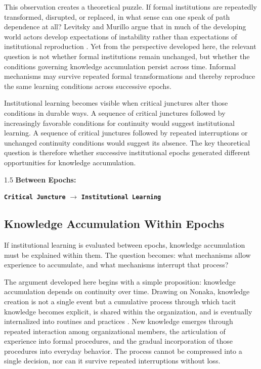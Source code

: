 \documentclass[doc, 12pt, a4paper,floatsintext]{apa7}
\begin{document}
This observation creates a theoretical puzzle. If formal institutions are repeatedly transformed, disrupted, or replaced, in what sense can one speak of path dependence at all? Levitsky and Murillo argue that in much of the developing world actors develop expectations of instability rather than expectations of institutional reproduction \parencite[123]{levitsky_variation_2009}. Yet from the perspective developed here, the relevant question is not whether formal institutions remain unchanged, but whether the conditions governing knowledge accumulation persist across time. Informal mechanisms may survive repeated formal transformations and thereby reproduce the same learning conditions across successive epochs.

Institutional learning becomes visible when critical junctures alter those conditions in durable ways. A sequence of critical junctures followed by increasingly favorable conditions for continuity would suggest institutional learning. A sequence of critical junctures followed by repeated interruptions or unchanged continuity conditions would suggest its absence. The key theoretical question is therefore whether successive institutional epochs generated different opportunities for knowledge accumulation.

\begin{spacing}{1.5}
\noindent
\textbf{Between Epochs:}

\texttt{\bf Critical Juncture}
$\rightarrow$
\texttt{\bf Institutional Learning}
\end{spacing}

\subsection{Knowledge Accumulation Within Epochs}

If institutional learning is evaluated between epochs, knowledge accumulation must be explained within them. The question becomes: what mechanisms allow experience to accumulate, and what mechanisms interrupt that process?

The argument developed here begins with a simple proposition: knowledge accumulation depends on continuity over time. Drawing on Nonaka, knowledge creation is not a single event but a cumulative process through which tacit knowledge becomes explicit, is shared within the organization, and is eventually internalized into routines and practices \parencite{nonaka_knowledge-creating_1998}. New knowledge emerges through repeated interaction among organizational members, the articulation of experience into formal procedures, and the gradual incorporation of those procedures into everyday behavior. The process cannot be compressed into a single decision, nor can it survive repeated interruptions without loss.
\end{document}

